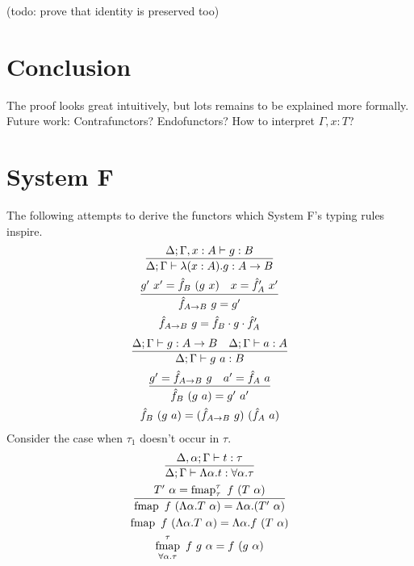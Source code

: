 \documentclass[proof]{article}
\newcommand{\entail}{\vdash}
\newcommand{\fmap}{\mathop{\mathrm{fmap}}}
\newcommand{\ff}{\hat{f}}
\begin{document}
\begin{multicols}{2}
(todo: prove that identity is preserved too)

\section{Conclusion}\label{conclusion}
\vspace{-\parskip}\hspace*{\parindent}The proof looks great intuitively, but lots remains to be explained more formally. Future work: Contrafunctors? Endofunctors? How to interpret $\Gamma, x : T$?
\end{multicols}

\section{System F}
The following attempts to derive the functors which System F's typing rules inspire.
\begin{subequations}
\begin{gather}
\infer{\Delta;\Gamma\entail\lambda(x:A).g:A\rightarrow B}{
  \Delta;\Gamma,x:A\entail g:B
}\\
\infer{\ff_{A\rightarrow B}~g = g'}{
  g'~x' = \ff_B~(g~x) &
  x = \ff'_A~x'
}\\
\ff_{A\rightarrow B}~g = \ff_B\cdot g\cdot\ff'_A
\end{gather}
\end{subequations}
\begin{subequations}
\begin{gather}
\infer{\Delta;\Gamma\entail g~a:B}{
  \Delta;\Gamma\entail g:A\rightarrow B &
  \Delta;\Gamma\entail a:A
}\\
\infer{\ff_B~(g~a) = g'~a'}{
  g' = \ff_{A\rightarrow B}~g &
  a' = \ff_A~a
}\\
\ff_B~(g~a) = (\ff_{A\rightarrow B}~g)~(\ff_A~a)
\end{gather}
\end{subequations}
Consider the case when $\tau_1$ doesn't occur in $\tau$.
\begin{subequations}
\begin{gather}
\infer{\Delta;\Gamma\entail\Lambda\alpha.t:\forall\alpha.\tau}{
  \Delta,\alpha;\Gamma\entail t : \tau
}\\
\infer{\fmap~f~(\Lambda\alpha.T~\alpha) = \Lambda\alpha.(T'~\alpha)}{
  T'~\alpha = \fmap^{\tau}_{\tau}~f~(T~\alpha)
}\\
\fmap~f~(\Lambda\alpha.T~\alpha) = \Lambda\alpha.f~(T~\alpha)
\\
\fmap^{\tau}_{\forall\alpha.\tau}~f~g~\alpha = f~(g~\alpha)
\end{gather}
\end{subequations}
\end{document}
